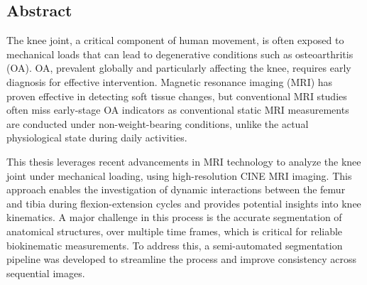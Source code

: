 \documentclass{micro-econ-thesis}
\begin{document}
\thesisCompany{}

\thesisMakeTitle

\cleardoublepage
{}
\pagestyle{plain}
\subsection*{Abstract}

The knee joint, a critical component of human movement, is often exposed to mechanical loads that can lead to degenerative conditions such as osteoarthritis (OA). OA, prevalent globally and particularly affecting the knee, requires early diagnosis for effective intervention. Magnetic resonance imaging (MRI) has proven effective in detecting soft tissue changes, but conventional MRI studies often miss early-stage OA indicators as conventional static MRI measurements are conducted under non-weight-bearing conditions, unlike the actual physiological state during daily activities.

This thesis leverages recent advancements in MRI technology to analyze the knee joint under mechanical loading, using high-resolution CINE MRI imaging. This approach enables the investigation of dynamic interactions between the femur and tibia during flexion-extension cycles and provides potential insights into knee kinematics. A major challenge in this process is the accurate segmentation of anatomical structures, over multiple time frames, which is critical for reliable biokinematic measurements. To address this, a semi-automated segmentation pipeline was developed to streamline the process and improve consistency across sequential images.
\end{document}
